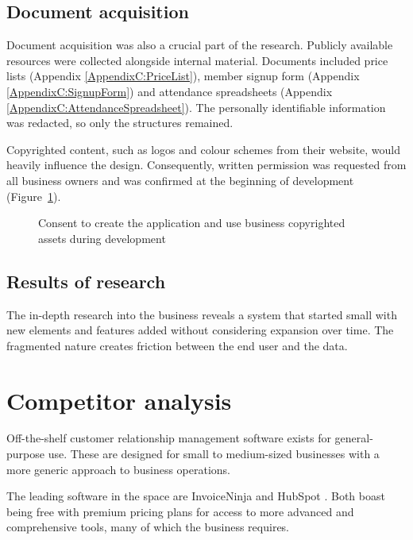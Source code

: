\subsection{Document acquisition}
Document acquisition was also a crucial part of the research. Publicly available resources were collected alongside internal material. Documents included price lists (Appendix \ref{AppendixC:PriceList}), member signup form (Appendix \ref{AppendixC:SignupForm}) and attendance spreadsheets (Appendix \ref{AppendixC:AttendanceSpreadsheet}). The personally identifiable information was redacted, so only the structures remained.

Copyrighted content, such as logos and colour schemes from their website, would heavily influence the design. Consequently, written permission was requested from all business owners and was confirmed at the beginning of development (Figure~\ref{fig:consent}).

\begin{figure}[ht!]
    \centerline{}
    \caption{Consent to create the application and use business copyrighted assets during development}
    \label{fig:consent}
\end{figure}


\subsection{Results of research}
The in-depth research into the business reveals a system that started small with new elements and features added without considering expansion over time. The fragmented nature creates friction between the end user and the data.


\section{Competitor analysis}
Off-the-shelf customer relationship management software exists for general-purpose use. These are designed for small to medium-sized businesses with a more generic approach to business operations.

The leading software in the space are InvoiceNinja \parencite{noauthor_invoice_nodate} and HubSpot \parencite{noauthor_hubspot_2022}. Both boast being free with premium pricing plans for access to more advanced and comprehensive tools, many of which the business requires.

